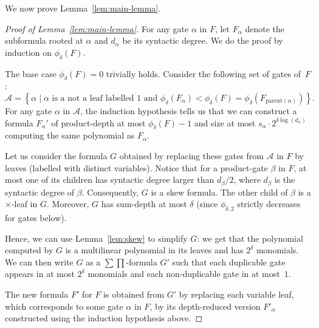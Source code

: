 \documentclass[11pt,a4paper]{article}
\newcommand{\comment}[2]{\marginpar{\tiny{\textbf{#1: }\textit{#2}}}}
\newcommand{\gm}[1]{\comment{GM}{#1}}
\begin{document}
We now prove Lemma~\ref{lem:main-lemma}. 
\begin{proof}[Proof of Lemma~\ref{lem:main-lemma}]
	For any gate $\alpha$ in $F$, let $F_\alpha$ denote the subformula rooted at $\alpha$ and \(d_{\alpha}\) be its syntactic degree. We do the proof by induction on \(\phi_{\delta}(F)\).
	
	The base case $\phi_\delta(F) = 0$ trivially holds. 
	Consider the following set of gates of~$F$: 
	\[ \mathcal{A} = \left\{\alpha \mid \alpha \text{ is a not a leaf labelled~$1$  and }\phi_{\delta}(F_\alpha)  < \phi_{\delta}(F) = \phi_{\delta}(F_{\text{parent}(\alpha)})\right\}.\] 
	For any gate \(\alpha\) in \(\mathcal{A}\), the induction hypothesis tells us that we can construct a formula $F_\alpha'$ of product-depth at most \(\phi_{\delta}(F)-1\)  and size at most \(s_{\alpha}\cdot 2^{\delta \log(d_\alpha)}\) computing the same polynomial as $F_\alpha.$
	
	Let us consider the formula \(G\) obtained by replacing these gates from $\mathcal{A}$ in \(F\)  by leaves (labelled with distinct variables). Notice that for a product-gate \(\beta\) in $F$, at most one of its children has syntactic degree larger than \(d_{\beta}/2\), where $d_\beta$ is the syntactic degree of $\beta$. Consequently, \(G\) is a skew formula.  The other child of $\beta$ is a $\times$-leaf in $G$. Moreover, \(G\) has sum-depth at most \(\delta\) (since \(\phi_{\delta,2}\) strictly decreases for gates below). 
	
	Hence, we can use Lemma~\ref{lem:skew} to simplify $G$: we get that the polynomial computed by $G$ is a multilinear polynomial in its leaves and has $2^\delta$ monomials. We can then  write $G$ as a \(\sum\prod\)-formula $G'$    such that each duplicable gate appears in  at most $2^\delta$ monomials and each non-duplicable gate in at most~$1$.
	
	The new formula $F'$ for $F$ is obtained from $G'$ by replacing each variable leaf, which corresponds to some gate $\alpha$ in $F$, by its depth-reduced version $F'_\alpha$ constructed using the induction hypothesis above.
	

\end{proof}
\end{document}

